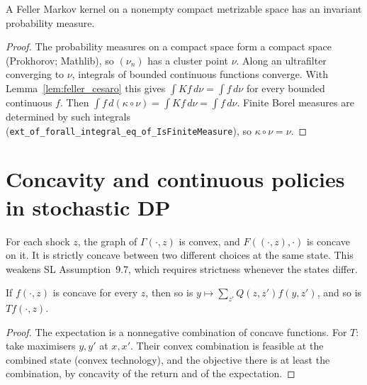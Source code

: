 \begin{theorem}
\label{thm:exists_invariant_of_feller}
\leanok
{}
A Feller Markov kernel on a nonempty compact metrizable space has an invariant probability measure.
\end{theorem}
\begin{proof}
\leanok
The probability measures on a compact space form a compact space (Prokhorov; Mathlib), so $(\nu_n)$ has a
cluster point $\nu$. Along an ultrafilter converging to $\nu$, integrals of bounded continuous functions
converge. With Lemma~\ref{lem:feller_cesaro} this gives $\int Kf\,d\nu = \int f\,d\nu$ for every bounded
continuous $f$. Then $\int f\,d(\kappa\circ\nu) = \int Kf\,d\nu = \int f\,d\nu$. Finite Borel measures are
determined by such integrals (\texttt{ext\_of\_forall\_integral\_eq\_of\_IsFiniteMeasure}), so $\kappa \circ \nu = \nu$.
\end{proof}

\section{Concavity and continuous policies in stochastic DP}
\label{sec:stoch_concavity}

\begin{definition}
\label{def:stoch_concavity}
\leanok
{}
For each shock $z$, the graph of $\Gamma(\cdot, z)$ is convex, and $F((\cdot, z), \cdot)$ is concave on it. It is strictly
concave between two different choices at the same state. This weakens SL Assumption~9.7, which requires
strictness whenever the states differ.
\end{definition}

\begin{lemma}
\label{lem:stoch_concave_bellmanOp}
\leanok
{}
If $f(\cdot, z)$ is concave for every $z$, then so is $y \mapsto \sum_{z'} Q(z,z') f(y,z')$, and so is $Tf(\cdot, z)$.
\end{lemma}
\begin{proof}
\leanok
The expectation is a nonnegative combination of concave functions. For $T$: take maximisers $y, y'$ at
$x, x'$. Their convex combination is feasible at the combined state (convex technology), and the objective
there is at least the combination, by concavity of the return and of the expectation.
\end{proof}

